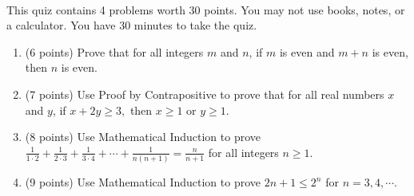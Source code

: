\documentclass[12pt]{article}
\newcommand{\be}{\begin{enumerate}}
\newcommand{\ee}{\end{enumerate}}
\begin{document}
\thispagestyle{fancy}


\\

\noindent This quiz contains 4 problems worth 30 points. You may not use books, notes, or a calculator. You have 30 minutes to take the quiz.\\

\noindent \hrulefill
\be
\item (6 points) Prove that for all integers $m$ and $n$, if $m$ is even and $m+n$ is even, then $n$ is even.\\
\vspace{2.5in}
\item (7 points) Use Proof by Contrapositive to prove that for all real numbers $x$ and $y$, if $x+2y \geq 3,$ then $x\geq1$ or $y\geq 1.$
\vfill
\newpage
\item (8 points) Use Mathematical Induction to prove $\frac{1}{1\cdot 2}+\frac{1}{2\cdot 3}+\frac{1}{3 \cdot 4}+\cdots+\frac{1}{n(n+1)}=\frac{n}{n+1}$ for all integers $n \geq 1.$
\vfill
\item (9 points) Use Mathematical Induction to prove $ 2n+1 \leq 2^n$ for $n=3,4, \cdots.$
\vfill
\ee
\end{document}
